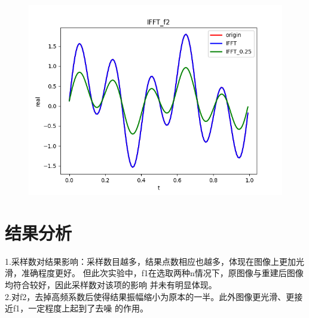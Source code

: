 \documentclass[12pt,a4paper,oneside]{article}
\begin{document}
\begin{figure}[H]
    \centering
    \includegraphics[scale = 0.85]{../res/figs/IFFT_f2.png}
\end{figure}

\section{结果分析}\noindent
1.采样数对结果影响：采样数目越多，结果点数相应也越多，体现在图像上更加光滑，准确程度更好。
但此次实验中，f1在选取两种n情况下，原图像与重建后图像均符合较好，因此采样数对该项的影响
并未有明显体现。\\
2.对f2，去掉高频系数后使得结果振幅缩小为原本的一半。此外图像更光滑、更接近f1，一定程度上起到了去噪
的作用。
\end{document}

